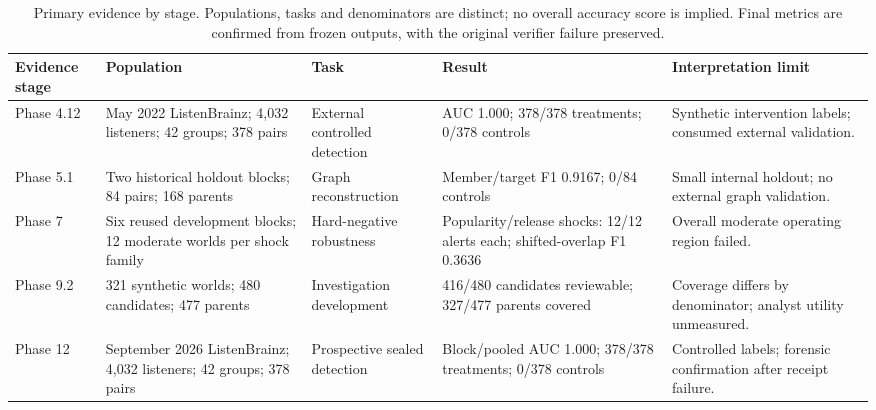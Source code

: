 \begin{table}[tbp]\centering\small
\caption{Primary evidence by stage. Populations, tasks and denominators are distinct; no overall accuracy score is implied. Final metrics are confirmed from frozen outputs, with the original verifier failure preserved.}
\begin{tabularx}{\linewidth}{@{}p{.10\linewidth}p{.23\linewidth}p{.16\linewidth}p{.21\linewidth}X@{}}\toprule
Evidence stage & Population & Task & Result & Interpretation limit\\\midrule
Phase 4.12 & May 2022 ListenBrainz; 4,032 listeners; 42 groups; 378 pairs & External controlled detection & AUC 1.000; 378/378 treatments; 0/378 controls & Synthetic intervention labels; consumed external validation.\\
Phase 5.1 & Two historical holdout blocks; 84 pairs; 168 parents & Graph reconstruction & Member/target F1 0.9167; 0/84 controls & Small internal holdout; no external graph validation.\\
Phase 7 & Six reused development blocks; 12 moderate worlds per shock family & Hard-negative robustness & Popularity/release shocks: 12/12 alerts each; shifted-overlap F1 0.3636 & Overall moderate operating region failed.\\
Phase 9.2 & 321 synthetic worlds; 480 candidates; 477 parents & Investigation development & 416/480 candidates reviewable; 327/477 parents covered & Coverage differs by denominator; analyst utility unmeasured.\\
Phase 12 & September 2026 ListenBrainz; 4,032 listeners; 42 groups; 378 pairs & Prospective sealed detection & Block/pooled AUC 1.000; 378/378 treatments; 0/378 controls & Controlled labels; forensic confirmation after receipt failure.\\
\bottomrule\end{tabularx}\label{tab:results}
\end{table}